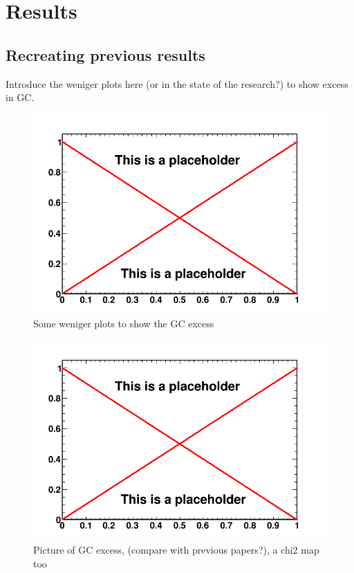 \chapter{Results}
\label{ch:results}
%

\section{Recreating previous results}

Introduce the weniger plots here (or in the state of the research?) to show excess in GC.
\begin{figure}
  \centering
  \includegraphics[width=.9\linewidth]{pic/dummy.png}
  \caption{Some weniger plots to show the GC excess}
  \label{fig:weniger_plot}
\end{figure}



\begin{figure}
  \centering
  \includegraphics[width=.9\linewidth]{pic/dummy.png}
  \caption{Picture of GC excess, (compare with previous papers?), a chi2 map too}
  \label{fig:original_GC_excess}
\end{figure}

